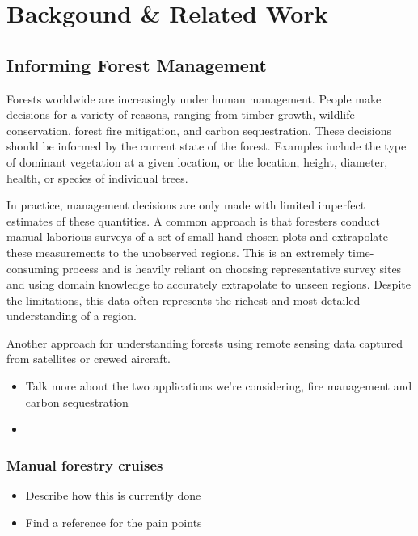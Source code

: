 
\chapter{Backgound \& Related Work} \label{chapBackground}
\section{Informing Forest Management}
    
Forests worldwide are increasingly under human management. People make decisions for a variety of reasons, ranging from timber growth, wildlife conservation, forest fire mitigation, and carbon sequestration. These decisions should be informed by the current state of the forest. Examples include the type of dominant vegetation at a given location, or the location, height, diameter, health, or species of individual trees.

In practice, management decisions are only made with limited imperfect estimates of these quantities. A common approach is that foresters conduct manual laborious surveys of a set of small hand-chosen plots and extrapolate these measurements to the unobserved regions. This is an extremely time-consuming process and is heavily reliant on choosing representative survey sites and using domain knowledge to accurately extrapolate to unseen regions.
Despite the limitations, this data often represents the richest and most detailed understanding of a region.

Another approach for understanding forests using remote sensing data captured from satellites or crewed aircraft.

\begin{itemize}
    \item Talk more about the two applications we're considering, fire management and carbon sequestration
    \item 
\end{itemize}

\subsection{Manual forestry cruises}
\begin{itemize}
    \item Describe how this is currently done
    \item Find a reference for the pain points
\end{itemize}


